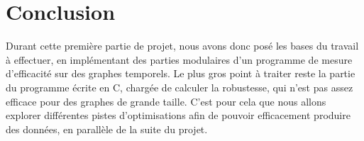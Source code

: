 \section{Conclusion}\label{sec:conclusion}

Durant cette première partie de projet, nous avons donc posé les bases du travail à 
effectuer, en implémentant des parties modulaires d'un programme de mesure d'efficacité sur des graphes temporels.
Le plus gros point à traiter reste la partie du programme écrite en C, chargée de calculer la robustesse, qui n'est pas 
assez efficace pour des graphes de grande taille. C'est pour cela que nous allons
explorer différentes pistes d'optimisations afin de pouvoir efficacement produire des données, en parallèle de la suite du projet.
